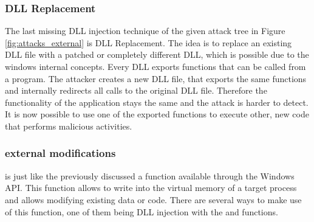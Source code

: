 \subsubsection{DLL Replacement}
The last missing DLL injection technique of the given attack tree in Figure \ref{fig:attacks_external} is DLL Replacement. The idea is to replace an existing DLL file with a patched or completely different DLL, which is possible due to the windows internal concepts. Every DLL exports functions that can be called from a program. The attacker creates a new DLL file, that exports the same functions and internally redirects all calls to the original DLL file. Therefore the functionality of the application stays the same and the attack is harder to detect. It is now possible to use one of the exported functions to execute other, new code that performs malicious activities.

\subsubsection{ external modifications}
 is just like the previously discussed  a function available through the Windows API. This function allows to write into the virtual memory of a target process and allows modifying existing data or code. There are several ways to make use of this function, one of them being DLL injection with the  and  functions. 

